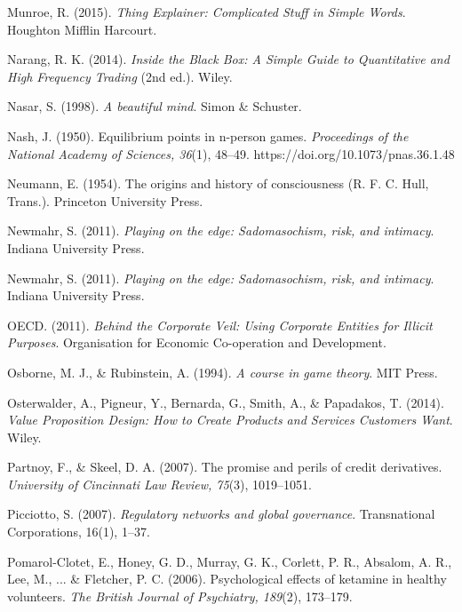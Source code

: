 \begin{thebibliography}{}
    Munroe, R. (2015). \textit{Thing Explainer: Complicated Stuff in Simple Words}. Houghton Mifflin Harcourt.


    Narang, R. K. (2014). \textit{Inside the Black Box: A Simple Guide to Quantitative and High Frequency Trading} (2nd ed.). Wiley.

    Nasar, S. (1998). \textit{A beautiful mind}. Simon \& Schuster.

    Nash, J. (1950). Equilibrium points in n-person games. \textit{Proceedings of the National Academy of Sciences, 36}(1), 48–49. https://doi.org/10.1073/pnas.36.1.48

    Neumann, E. (1954). The origins and history of consciousness (R. F. C. Hull, Trans.). Princeton University Press.

    Newmahr, S. (2011). \textit{Playing on the edge: Sadomasochism, risk, and intimacy}. Indiana University Press.

    Newmahr, S. (2011). \textit{Playing on the edge: Sadomasochism, risk, and intimacy}. Indiana University Press.


    OECD. (2011). \textit{Behind the Corporate Veil: Using Corporate Entities for Illicit Purposes}. Organisation for Economic Co-operation and Development.

    Osborne, M. J., \& Rubinstein, A. (1994). \textit{A course in game theory}. MIT Press.

    Osterwalder, A., Pigneur, Y., Bernarda, G., Smith, A., \& Papadakos, T. (2014). \textit{Value Proposition Design: How to Create Products and Services Customers Want}. Wiley.


    Partnoy, F., \& Skeel, D. A. (2007). The promise and perils of credit derivatives. \textit{University of Cincinnati Law Review, 75}(3), 1019–1051.

    Picciotto, S. (2007). \textit{Regulatory networks and global governance}. Transnational Corporations, 16(1), 1–37.

    Pomarol-Clotet, E., Honey, G. D., Murray, G. K., Corlett, P. R., Absalom, A. R., Lee, M., ... \& Fletcher, P. C. (2006). Psychological effects of ketamine in healthy volunteers. \textit{The British Journal of Psychiatry, 189}(2), 173–179.


\end{thebibliography}
